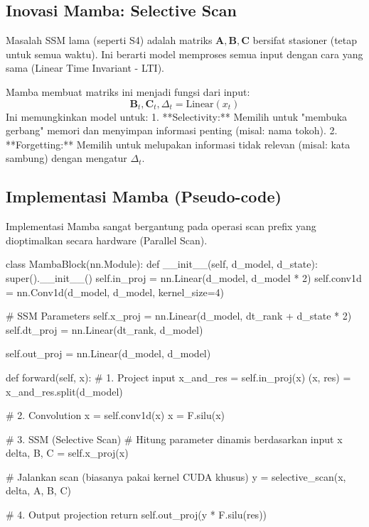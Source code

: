\subsection{Inovasi Mamba: Selective Scan}
Masalah SSM lama (seperti S4) adalah matriks $\mathbf{A}, \mathbf{B}, \mathbf{C}$ bersifat stasioner (tetap untuk semua waktu). Ini berarti model memproses semua input dengan cara yang sama (Linear Time Invariant - LTI).

Mamba membuat matriks ini menjadi fungsi dari input:
\begin{equation}
\mathbf{B}_t, \mathbf{C}_t, \Delta_t = \text{Linear}(x_t)
\end{equation}
Ini memungkinkan model untuk:
1.  **Selectivity:** Memilih untuk "membuka gerbang" memori dan menyimpan informasi penting (misal: nama tokoh).
2.  **Forgetting:** Memilih untuk melupakan informasi tidak relevan (misal: kata sambung) dengan mengatur $\Delta_t$.

\subsection{Implementasi Mamba (Pseudo-code)}
Implementasi Mamba sangat bergantung pada operasi scan prefix yang dioptimalkan secara hardware (Parallel Scan).

\begin{codeblock}[language=Python]
class MambaBlock(nn.Module):
    def __init__(self, d_model, d_state):
        super().__init__()
        self.in_proj = nn.Linear(d_model, d_model * 2)
        self.conv1d = nn.Conv1d(d_model, d_model, kernel_size=4)

        # SSM Parameters
        self.x_proj = nn.Linear(d_model, dt_rank + d_state * 2)
        self.dt_proj = nn.Linear(dt_rank, d_model)

        self.out_proj = nn.Linear(d_model, d_model)

    def forward(self, x):
        # 1. Project input
        x_and_res = self.in_proj(x)
        (x, res) = x_and_res.split(d_model)

        # 2. Convolution
        x = self.conv1d(x)
        x = F.silu(x)

        # 3. SSM (Selective Scan)
        # Hitung parameter dinamis berdasarkan input x
        delta, B, C = self.x_proj(x)

        # Jalankan scan (biasanya pakai kernel CUDA khusus)
        y = selective_scan(x, delta, A, B, C)

        # 4. Output projection
        return self.out_proj(y * F.silu(res))
\end{codeblock}

